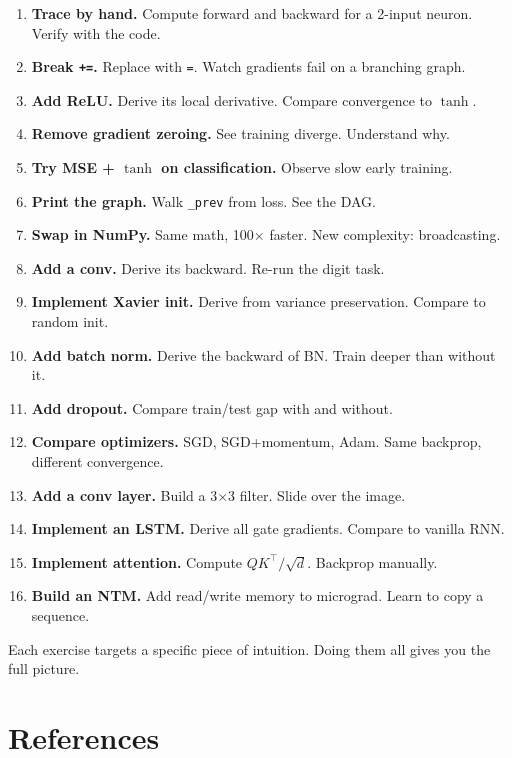 \documentclass[11pt,a4paper]{book}
\begin{document}
\begin{enumerate}[label=\textbf{\arabic*.}, leftmargin=*]
    \item \textbf{Trace by hand.} Compute forward and backward for a 2-input neuron. Verify with the code.
    \item \textbf{Break \texttt{+=}.} Replace with \texttt{=}. Watch gradients fail on a branching graph.
    \item \textbf{Add ReLU.} Derive its local derivative. Compare convergence to $\tanh$.
    \item \textbf{Remove gradient zeroing.} See training diverge. Understand why.
    \item \textbf{Try MSE + $\tanh$ on classification.} Observe slow early training.
    \item \textbf{Print the graph.} Walk \texttt{\_prev} from loss. See the DAG.
    \item \textbf{Swap in NumPy.} Same math, 100$\times$ faster. New complexity: broadcasting.
    \item \textbf{Add a conv.} Derive its backward. Re-run the digit task.
    \item \textbf{Implement Xavier init.} Derive from variance preservation. Compare to random init.
    \item \textbf{Add batch norm.} Derive the backward of BN. Train deeper than without it.
    \item \textbf{Add dropout.} Compare train/test gap with and without.
    \item \textbf{Compare optimizers.} SGD, SGD+momentum, Adam. Same backprop, different convergence.
    \item \textbf{Add a conv layer.} Build a 3$\times$3 filter. Slide over the image.
    \item \textbf{Implement an LSTM.} Derive all gate gradients. Compare to vanilla RNN.
    \item \textbf{Implement attention.} Compute $QK^\top/\sqrt{d}$. Backprop manually.
    \item \textbf{Build an NTM.} Add read/write memory to micrograd. Learn to copy a sequence.
\end{enumerate}
Each exercise targets a specific piece of intuition. Doing them all gives you the full picture.

\chapter*{References}
\end{document}
